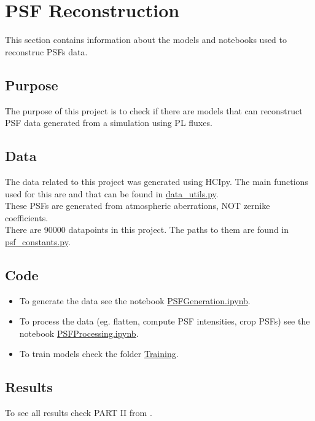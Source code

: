 \section{PSF Reconstruction}
	This section contains information about the models and notebooks used to reconstruc PSFs data.

	
	\subsection{Purpose}
	
		The purpose of this project is to check if there are models that can reconstruct PSF data generated from a simulation using PL fluxes.
		
		
	\subsection{Data}
	
		The data related to this project was generated using HCIpy. The main functions used for this are  and  that can be found in \href{https://github.com/Dacarpe03/PLImageReconstruction/blob/main/Utils/data_utils.py}{data\_utils.py}.\\
		
		These PSFs are generated from atmospheric aberrations, NOT zernike coefficients.\\
		
		There are 90000 datapoints in this project. The paths to them are found in \href{https://github.com/Dacarpe03/PLImageReconstruction/blob/main/Utils/psf_constants.py}{psf\_constants.py}.\\
	
	
	\subsection{Code}

		\begin{itemize}
			\item To generate the data see the notebook \href{https://github.com/Dacarpe03/PLImageReconstruction/blob/main/PSFReconstruction/DataNotebooks/PSFGeneration.ipynb}{PSFGeneration.ipynb}.
			\item To process the data (eg. flatten, compute PSF intensities, crop PSFs) see the notebook \href{https://github.com/Dacarpe03/PLImageReconstruction/blob/main/PSFReconstruction/DataNotebooks/PSFProcessing.ipynb}{PSFProcessing.ipynb}.
			\item To train models check the folder \href{https://github.com/Dacarpe03/PLImageReconstruction/tree/main/PSFReconstruction/Training}{Training}.
			
		\end{itemize}


	\subsection{Results}
		To see all results check PART II from .
	
		
